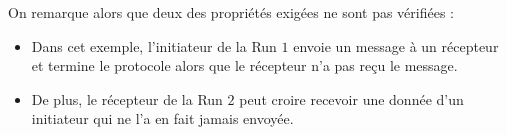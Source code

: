 \documentclass[a4paper,10pt]{article}
\begin{document}
On remarque alors que deux des propriétés exigées ne sont pas vérifiées :
\begin{itemize}
\item Dans cet exemple, l'initiateur de la Run $1$ envoie un message à un récepteur et termine le protocole alors que le récepteur n'a pas reçu le message. 
\item De plus, le récepteur de la Run $2$ peut croire recevoir une donnée d'un initiateur qui ne l'a en fait jamais envoyée.
\end{itemize}



\end{document}
